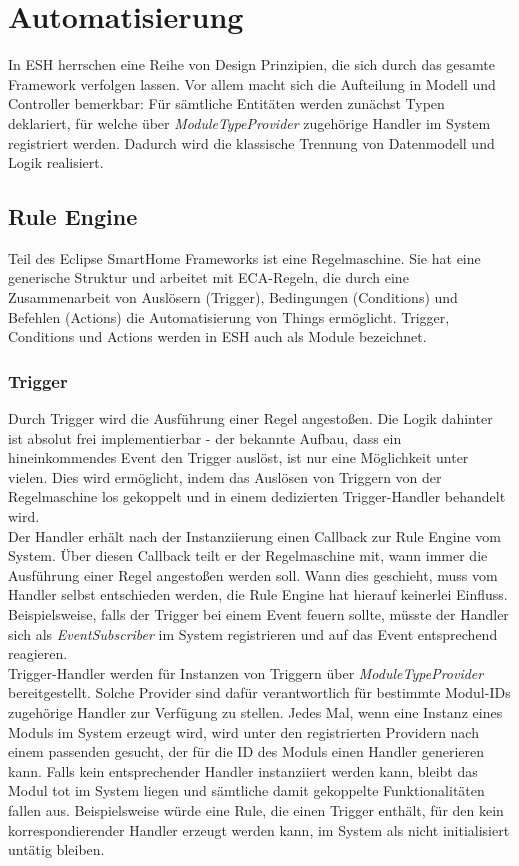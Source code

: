 \section{Automatisierung}
In ESH herrschen eine Reihe von Design Prinzipien, die sich durch das gesamte Framework verfolgen lassen. Vor allem macht sich die Aufteilung in Modell und Controller bemerkbar: Für sämtliche Entitäten werden zunächst Typen deklariert, für welche über \textit{ModuleTypeProvider} zugehörige Handler im System registriert werden. Dadurch wird die klassische Trennung von Datenmodell und Logik realisiert.

\subsection{Rule Engine}
\label{sec:ruleengine}
Teil des Eclipse SmartHome Frameworks ist eine Regelmaschine. Sie hat eine generische Struktur und arbeitet mit ECA-Regeln, die durch eine Zusammenarbeit von Auslösern (Trigger), Bedingungen (Conditions) und Befehlen (Actions) die Automatisierung von Things ermöglicht. Trigger, Conditions und Actions werden in ESH auch als Module bezeichnet.


\subsubsection{Trigger}
Durch Trigger wird die Ausführung einer Regel angestoßen. Die Logik dahinter ist absolut frei implementierbar - der bekannte Aufbau, dass ein hineinkommendes Event den Trigger auslöst, ist nur eine Möglichkeit unter vielen. Dies wird ermöglicht, indem das Auslösen von Triggern von der Regelmaschine los gekoppelt und in einem dedizierten Trigger-Handler behandelt wird. \\

Der Handler erhält nach der Instanziierung einen Callback zur Rule Engine vom System. Über diesen Callback teilt er der Regelmaschine mit, wann immer die Ausführung einer Regel angestoßen werden soll. Wann dies geschieht, muss vom Handler selbst entschieden werden, die Rule Engine hat hierauf keinerlei Einfluss. Beispielsweise, falls der Trigger bei einem Event feuern sollte, müsste der Handler sich als \textit{EventSubscriber} im System registrieren und auf das Event entsprechend reagieren.\\

Trigger-Handler werden für Instanzen von Triggern über \textit{ModuleTypeProvider} bereitgestellt. Solche Provider sind dafür verantwortlich für bestimmte Modul-IDs zugehörige Handler zur Verfügung zu stellen. Jedes Mal, wenn eine Instanz eines Moduls im System erzeugt wird, wird unter den registrierten Providern nach einem passenden gesucht, der für die ID des Moduls einen Handler generieren kann. Falls kein entsprechender Handler instanziiert werden kann, bleibt das Modul tot im System liegen und sämtliche damit gekoppelte Funktionalitäten fallen aus. Beispielsweise würde eine Rule, die einen Trigger enthält, für den kein korrespondierender Handler erzeugt werden kann, im System als \glqq nicht initialisiert\grqq{} untätig bleiben.

